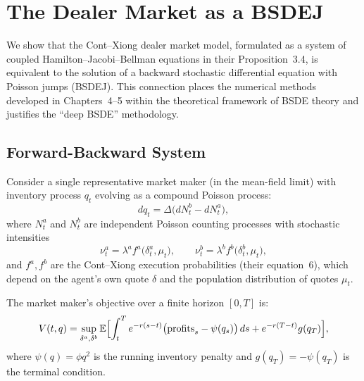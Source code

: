 
\section{The Dealer Market as a BSDEJ}
\label{sec:bsde-connection}

We show that the Cont--Xiong dealer market model, formulated as a
system of coupled Hamilton--Jacobi--Bellman equations in their
Proposition~3.4, is equivalent to the solution of a backward stochastic
differential equation with Poisson jumps (BSDEJ). This connection places
the numerical methods developed in Chapters~4--5 within the theoretical
framework of BSDE theory and justifies the ``deep BSDE'' methodology.

\subsection{Forward-Backward System}

Consider a single representative market maker (in the mean-field limit)
with inventory process $q_t$ evolving as a compound Poisson process:
\begin{equation}\label{eq:forward-sde}
  dq_t = \Delta \bigl(dN^b_t - dN^a_t\bigr),
\end{equation}
where $N^a_t$ and $N^b_t$ are independent Poisson counting processes
with stochastic intensities
\begin{equation}
  \nu^a_t = \lambda^a f^a\bigl(\delta^a_t, \mu_t\bigr), \qquad
  \nu^b_t = \lambda^b f^b\bigl(\delta^b_t, \mu_t\bigr),
\end{equation}
and $f^a, f^b$ are the Cont--Xiong execution probabilities (their
equation~6), which depend on the agent's own quote $\delta$ and the
population distribution of quotes $\mu_t$.

The market maker's objective over a finite horizon $[0, T]$ is:
\begin{equation}\label{eq:objective}
  V(t, q) = \sup_{\delta^a, \delta^b} \mathbb{E}\Bigl[
    \int_t^T e^{-r(s-t)} \bigl(\text{profits}_s - \psi(q_s)\bigr)\,ds
    + e^{-r(T-t)} g(q_T)
  \Bigr],
\end{equation}
where $\psi(q) = \phi q^2$ is the running inventory penalty and
$g(q_T) = -\psi(q_T)$ is the terminal condition.

